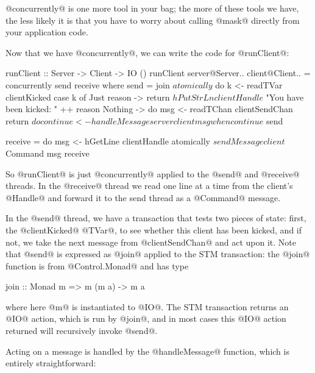 @concurrently@ is one more tool in your bag; the more of these tools
we have, the less likely it is that you have to worry about calling
@mask@ directly from your application code.

Now that we have @concurrently@, we can write the code for
@runClient@:

\begin{haskell}
runClient :: Server -> Client -> IO ()
runClient server@Server{..} client@Client{..}
 = concurrently send receive
 where
    send = join $ atomically $ do
        k <- readTVar clientKicked
        case k of
            Just reason -> return $
                hPutStrLn clientHandle $ "You have been kicked: " ++ reason
            Nothing -> do
                msg <- readTChan clientSendChan
                return $ do
                    continue <- handleMessage server client msg
                    when continue $ send

    receive = do
       msg <- hGetLine clientHandle
       atomically $ sendMessage client $ Command msg
       receive
\end{haskell}

So @runClient@ is just @concurrently@ applied to the @send@ and
@receive@ threads.  In the @receive@ thread we read one line at a time
from the client's @Handle@ and forward it to the send thread as a
@Command@ message.

In the @send@ thread, we have a transaction that tests two pieces of
state: first, the @clientKicked@ @TVar@, to see whether this client
has been kicked, and if not, we take the next message from
@clientSendChan@ and act upon it.  Note that @send@ is expressed as
@join@ applied to the STM transaction: the @join@ function is from
@Control.Monad@ and has type

\begin{haskell}
join :: Monad m => m (m a) -> m a
\end{haskell}

\noindent where here @m@ is instantiated to @IO@.  The STM transaction
returns an @IO@ action, which is run by @join@, and in most cases this
@IO@ action returned will recursively invoke @send@.

Acting on a message is handled by the @handleMessage@ function, which
is entirely straightforward:

